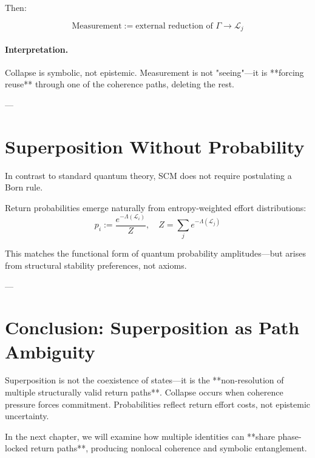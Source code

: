 Then:

\[
\text{Measurement} := \text{external reduction of } \Gamma \to \mathcal{L}_j
\]

\paragraph{Interpretation.}  
Collapse is symbolic, not epistemic. Measurement is not "seeing"—it is **forcing reuse** through one of the coherence paths, deleting the rest.

---

\section{Superposition Without Probability}

In contrast to standard quantum theory, SCM does not require postulating a Born rule.

Return probabilities emerge naturally from entropy-weighted effort distributions:
\[
p_i := \frac{e^{-\Lambda(\mathcal{L}_i)}}{Z},\quad Z = \sum_j e^{-\Lambda(\mathcal{L}_j)}
\]

This matches the functional form of quantum probability amplitudes—but arises from structural stability preferences, not axioms.

---

\section{Conclusion: Superposition as Path Ambiguity}

Superposition is not the coexistence of states—it is the **non-resolution of multiple structurally valid return paths**. Collapse occurs when coherence pressure forces commitment. Probabilities reflect return effort costs, not epistemic uncertainty.

In the next chapter, we will examine how multiple identities can **share phase-locked return paths**, producing nonlocal coherence and symbolic entanglement.
